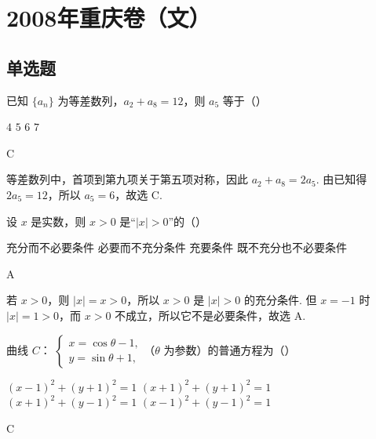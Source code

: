 \chapter{2008年重庆卷（文）}

\section{单选题}

\begin{problem}
已知 \(\{a_{n}\}\) 为等差数列，\(a_{2} + a_{8} = 12\)，则 \(a_{5}\) 等于（\quad）

\choices
    {\(4\)}
    {\(5\)}
    {\(6\)}
    {\(7\)}
\end{problem}

\begin{answer}
C
\end{answer}

\begin{solution}
等差数列中，首项到第九项关于第五项对称，因此 \(a_{2}+a_{8}=2a_{5}\). 由已知得 \(2a_{5}=12\)，所以 \(a_{5}=6\)，故选 C.
\end{solution}

\begin{problem}
设 \(x\) 是实数，则 \(x > 0\) 是“\(|x| > 0\)”的（\quad）

\choices
    {充分而不必要条件}
    {必要而不充分条件}
    {充要条件}
    {既不充分也不必要条件}
\end{problem}

\begin{answer}
A
\end{answer}

\begin{solution}
若 \(x>0\)，则 \(|x|=x>0\)，所以 \(x>0\) 是 \(|x|>0\) 的充分条件. 但 \(x=-1\) 时 \(|x|=1>0\)，而 \(x>0\) 不成立，所以它不是必要条件，故选 A.
\end{solution}

\begin{problem}
曲线 \(C\)： \(\begin{cases}
x = \cos\theta - 1,\\
y = \sin\theta + 1,
\end{cases}\)（\(\theta\) 为参数）的普通方程为（\quad）

\choices
    {\((x - 1)^2 + (y + 1)^2 = 1\)}
    {\((x + 1)^{2} + (y + 1)^{2} = 1\)}
    {\((x + 1)^{2} + (y - 1)^{2} = 1\)}
    {\((x - 1)^{2} + (y - 1)^{2} = 1\)}
\end{problem}

\begin{answer}
C
\end{answer}


